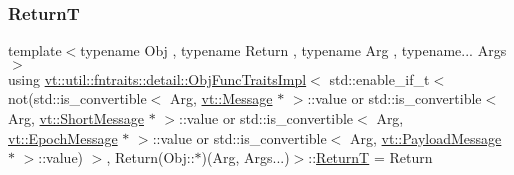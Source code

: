 \subsubsection{\texorpdfstring{ReturnT}{ReturnT}}
{\footnotesize\ttfamily template$<$typename Obj , typename Return , typename Arg , typename... Args$>$ \\
using \hyperlink{structvt_1_1util_1_1fntraits_1_1detail_1_1_obj_func_traits_impl}{vt\+::util\+::fntraits\+::detail\+::\+Obj\+Func\+Traits\+Impl}$<$ std\+::enable\+\_\+if\+\_\+t$<$ not(std\+::is\+\_\+convertible$<$ Arg, \hyperlink{namespacevt_a3a3ddfef40b4c90915fa43cdd5f129ea}{vt\+::\+Message} $\ast$ $>$\+::value or std\+::is\+\_\+convertible$<$ Arg, \hyperlink{namespacevt_a1125ac1da6c0bbf141e0ea0739d7602d}{vt\+::\+Short\+Message} $\ast$ $>$\+::value or std\+::is\+\_\+convertible$<$ Arg, \hyperlink{namespacevt_ad67368ffae52d7325002586b41bb150e}{vt\+::\+Epoch\+Message} $\ast$ $>$\+::value or std\+::is\+\_\+convertible$<$ Arg, \hyperlink{namespacevt_a89a92229c5622b855c02c549f83a1a68}{vt\+::\+Payload\+Message} $\ast$ $>$\+::value) $>$, Return(Obj\+::$\ast$)(Arg, Args...)$>$\+::\hyperlink{structvt_1_1util_1_1fntraits_1_1detail_1_1_obj_func_traits_impl_3_01std_1_1enable__if__t_3_01not1219121971b8d08f950169835519afd3_ac626d51f58f053e259a7b7fb8e9a01bb}{ReturnT} =  Return}

